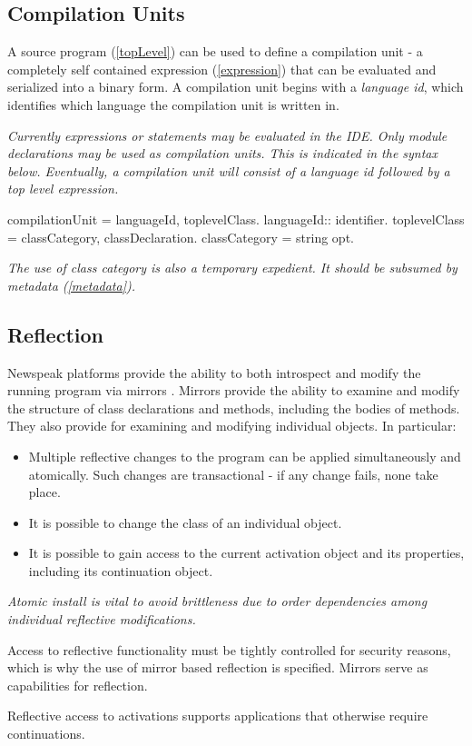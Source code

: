 \documentclass{article}
\begin{document}
\subsection{Compilation Units}

A source program  (\ref{topLevel}) can be used to define a compilation unit - a completely self contained expression  (\ref{expression})  that can be evaluated and serialized into a binary form. A compilation unit begins with a {\em language id}, which identifies which language the compilation unit is written in.

{\it
Currently expressions or statements may be evaluated in the IDE. Only module declarations may be used as compilation units. This is indicated in the syntax below. Eventually, a compilation unit will consist of a language id followed by a top level expression.
}

\begin{newspeak}
compilationUnit =  languageId, toplevelClass.
languageId:: identifier.
toplevelClass = classCategory, classDeclaration.
classCategory = string opt.
\end{newspeak}

{\it
The use of class category is also a temporary expedient. It should be subsumed by metadata (\ref{metadata}).
}

\subsection{Reflection}
\label{reflect}

Newspeak platforms provide the ability to both introspect and modify the running program via mirrors \cite{bracha-ungar04}.  Mirrors provide the ability to examine and modify the structure of class declarations and methods, including the bodies of methods. They also provide for examining and modifying individual objects. In particular: 
\begin{itemize}
\item Multiple reflective changes to the program can be applied simultaneously and atomically. Such changes are transactional - if any change fails, none take place.
\item It is possible to change the class of an individual object. 
\item It is possible to gain access to the current activation object and its properties, including its continuation object.
\end{itemize}


{\it
Atomic install is vital to avoid brittleness due to order dependencies among individual reflective modifications.

Access to reflective functionality must be tightly controlled for security reasons, which is why the use of mirror based reflection is specified. Mirrors serve as capabilities for reflection.

Reflective access to activations supports applications that otherwise require continuations.
}
\end{document}
